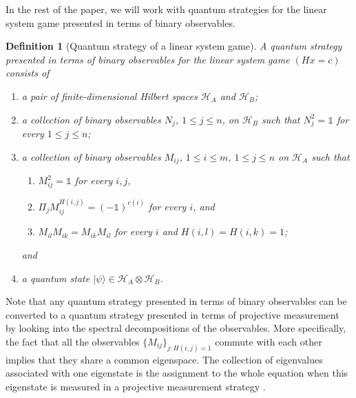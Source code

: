 \documentclass[11pt,letterpaper]{article}
\newcommand{\ket}[1]{|#1\rangle}
\newcommand{\x}{\otimes}
\newcommand{\calH}{\mathcal{H}}
\newcommand{\1}{\mathbb{1}}
\newtheorem{definition}[theorem]{Definition}
\theoremstyle{definition}
\begin{document}
In the rest of the paper, we will work with quantum strategies for the linear system game presented in terms of binary observables.
\begin{definition}[Quantum strategy of a linear system game]
\label{def:q_strat}
A quantum strategy presented in terms of binary observables for the linear system game $(Hx = c)$ consists of 
\begin{enumerate}
	\item a pair of finite-dimensional Hilbert spaces $\calH_A$ and $\calH_B$; 
	\item a collection of binary observables $N_j$, $1 \leq j \leq n$, on $\calH_B$
	such that $N_j^2 = \1$ for every $1 \leq j \leq n$; 
	\item a collection of binary observables $M_{ij}$, $1\leq i \leq m$, $1\leq j\leq n$ 
	on $\calH_A$ such that 
	\begin{enumerate}
		\item $M_{ij}^2 = \1$ for every $i,j$,
		\item $\Pi_j M_{ij}^{H(i,j)} = (-\1)^{c(i)}$ for every $i$, and
		\item $M_{il}M_{ik} = M_{ik}M_{il}$ for every $i$ and $H(i,l) = H(i,k) =1$;
	\end{enumerate} 
	and
	\item a quantum state $\ket{\psi} \in \calH_A \x \calH_B$.
\end{enumerate}
\end{definition}
Note that any quantum strategy presented in terms of binary observables can be 
converted to a quantum strategy presented in terms of projective measurement by looking into
the spectral decompositions of the observables. 
More specifically, the fact that all the observables $\{M_{ij}\}_{j: H(i,j) = 1}$ commute with each other
implies that they share a common eigenspace. The collection of eigenvalues associated with one eigenstate is the assignment
to the whole equation when this eigenstate is measured in a projective measurement strategy \cite{cleve2014}.
\end{document}
